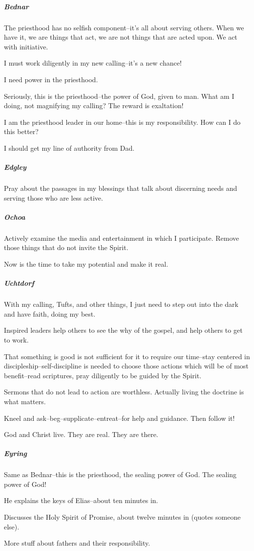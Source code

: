 \subparagraph*{Bednar} The priesthood has no selfish component--it's all about serving others. When we have it, we are things that act, we are not things that are acted upon. We act with initiative.

I must work diligently in my new calling--it's a new chance!

I need power in the priesthood.

Seriously, this is the priesthood--the power of God, given to man. What am I doing, not magnifying my calling? The reward is exaltation!

I am the priesthood leader in our home--this is my responsibility. How can I do this better?

I should get my line of authority from Dad.

\subparagraph*{Edgley} Pray about the passages in my blessings that talk about discerning needs and serving those who are less active.

\subparagraph*{Ochoa} Actively examine the media and entertainment in which I participate. Remove those things that do not invite the Spirit.

Now is the time to take my potential and make it real.

\subparagraph*{Uchtdorf} With my calling, Tufts, and other things, I just need to step out into the dark and have faith, doing my best.

Inspired leaders help others to see the why of the gospel, and help others to get to work.

That something is good is not sufficient for it to require our time--stay centered in discipleship--self-discipline is needed to choose those actions which will be of most benefit--read scriptures, pray diligently to be guided by the Spirit.

Sermons that do not lead to action are worthless. Actually living the doctrine is what matters.

Kneel and ask--beg--supplicate--entreat--for help and guidance. Then follow it!

God and Christ live. They are real. They are there.

\subparagraph*{Eyring} Same as Bednar--this is the priesthood, the sealing power of God. The sealing power of God!

He explains the keys of Elias--about ten minutes in. 

Discusses the Holy Spirit of Promise, about twelve minutes in (quotes someone else).

More stuff about fathers and their responsibility.

